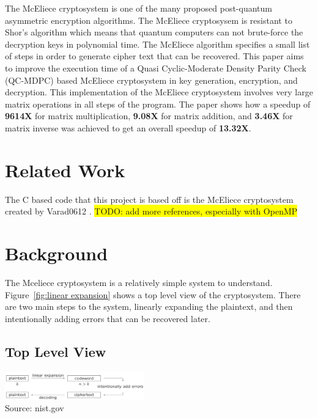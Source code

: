 \documentclass[conference]{IEEEtran}
\begin{document}
    The McEliece cryptosystem is one of the many proposed post-quantum asymmetric encryption algorithms. The McEliece cryptosysem is resistant to Shor's algorithm which means that quantum computers can not brute-force the decryption keys in polynomial time. 
    The McEliece algorithm specifies a small list of steps in order to generate cipher text that can be recovered. This paper aims to improve the execution time of a Quasi Cyclic-Moderate Density Parity Check (QC-MDPC) based McEliece cryptosystem in key generation, encryption, and decryption. This implementation of the McEliece cryptosystem involves very large matrix operations in all steps of the program. The paper shows how a speedup of \textbf{9614X} for matrix multiplication, \textbf{9.08X} for matrix addition, and \textbf{3.46X} for matrix inverse was achieved to get an overall speedup of \textbf{13.32X}.
    
    


\section{Related Work}\label{Related Work}
    The C based code that this project is based off is the McEliece cryptosystem created by Varad0612 \cite{varad0612}.
    \colorbox{yellow}{TODO: add more references, especially with OpenMP}


\section{Background}\label{Background}
    The Mceliece cryptosystem is a relatively simple system to understand. Figure~\ref{fig:linear expansion} shows a top level view of the cryptosystem. There are two main steps to the system, linearly expanding the plaintext, and then intentionally adding errors that can be recovered later.

    \subsection{Top Level View}\label{Top Level View}
        \begin{center}
            \includegraphics[width=0.45\textwidth]{Linear_Expansion.png}
            \\Source: nist.gov
            \label{fig:linear expansion}
        \end{center}
        
\end{document}
